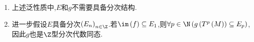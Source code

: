 \begin{remark}{}{}
	\begin{enumerate}
		\item 上述泛性质中,$E$和$g$不需要具备分次结构.
		\item 进一步假设$E$具备分次$\left(E_{n}\right)_{n\in\Z}$.若$\im\left(f\right)\subseteq E_{1}$,则$\forall p\in\N\left(g\left(T^{p}\left(M\right)\right)\subseteq E_{p}\right)$,因此$g$也是$\Z$型分次代数同态.
	\end{enumerate}
\end{remark}






















